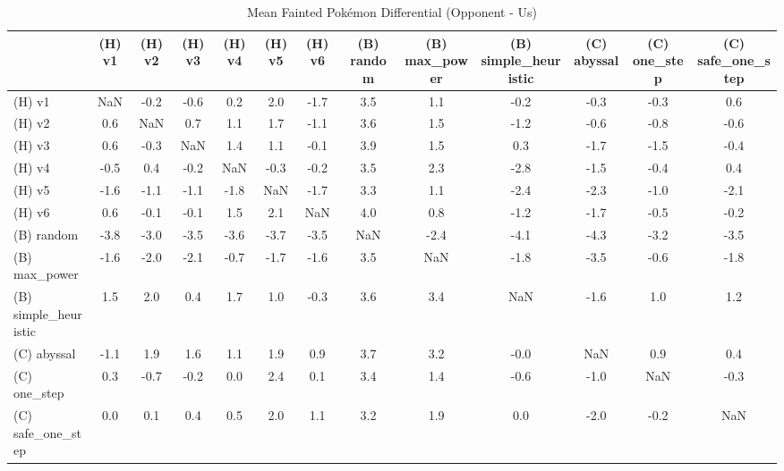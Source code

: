 \begin{table}[htbp]
\caption{Mean Fainted Pokémon Differential (Opponent - Us)}
\label{tab:fainted_diff}
\begin{tabular}{lcccccccccccc}
\hline
 & (H) v1 & (H) v2 & (H) v3 & (H) v4 & (H) v5 & (H) v6 & (B) random & (B) max\_power & (B) simple\_heuristic & (C) abyssal & (C) one\_step & (C) safe\_one\_step \\
\hline
(H) v1 & NaN & -0.2 & -0.6 & 0.2 & 2.0 & -1.7 & 3.5 & 1.1 & -0.2 & -0.3 & -0.3 & 0.6 \\
(H) v2 & 0.6 & NaN & 0.7 & 1.1 & 1.7 & -1.1 & 3.6 & 1.5 & -1.2 & -0.6 & -0.8 & -0.6 \\
(H) v3 & 0.6 & -0.3 & NaN & 1.4 & 1.1 & -0.1 & 3.9 & 1.5 & 0.3 & -1.7 & -1.5 & -0.4 \\
(H) v4 & -0.5 & 0.4 & -0.2 & NaN & -0.3 & -0.2 & 3.5 & 2.3 & -2.8 & -1.5 & -0.4 & 0.4 \\
(H) v5 & -1.6 & -1.1 & -1.1 & -1.8 & NaN & -1.7 & 3.3 & 1.1 & -2.4 & -2.3 & -1.0 & -2.1 \\
(H) v6 & 0.6 & -0.1 & -0.1 & 1.5 & 2.1 & NaN & 4.0 & 0.8 & -1.2 & -1.7 & -0.5 & -0.2 \\
(B) random & -3.8 & -3.0 & -3.5 & -3.6 & -3.7 & -3.5 & NaN & -2.4 & -4.1 & -4.3 & -3.2 & -3.5 \\
(B) max\_power & -1.6 & -2.0 & -2.1 & -0.7 & -1.7 & -1.6 & 3.5 & NaN & -1.8 & -3.5 & -0.6 & -1.8 \\
(B) simple\_heuristic & 1.5 & 2.0 & 0.4 & 1.7 & 1.0 & -0.3 & 3.6 & 3.4 & NaN & -1.6 & 1.0 & 1.2 \\
(C) abyssal & -1.1 & 1.9 & 1.6 & 1.1 & 1.9 & 0.9 & 3.7 & 3.2 & -0.0 & NaN & 0.9 & 0.4 \\
(C) one\_step & 0.3 & -0.7 & -0.2 & 0.0 & 2.4 & 0.1 & 3.4 & 1.4 & -0.6 & -1.0 & NaN & -0.3 \\
(C) safe\_one\_step & 0.0 & 0.1 & 0.4 & 0.5 & 2.0 & 1.1 & 3.2 & 1.9 & 0.0 & -2.0 & -0.2 & NaN \\
\hline
\end{tabular}
\end{table}
